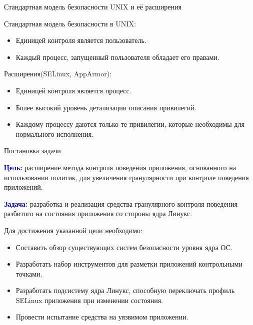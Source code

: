\documentclass{beamer}
\begin{document}
\begin{frame}{Стандартная модель безопасности UNIX и её расширения}

\begin{block}{Стандартная модель безопасности в UNIX:}
\begin{itemize}
\item Единицей контроля является пользователь.
\item Каждый процесс, запущенный пользователя обладает его правами.
\end{itemize}
\end{block}

\begin{block}{Расширения(SELinux, AppArmor):}
\begin{itemize}
\item Единицей контроля является процесс.
\item Более высокий уровень детализации описания привилегий.
\item Каждому процессу даются только те привилегии, которые необходимы для нормального исполнения.
\end{itemize}
\end{block}
\end{frame}

\begin{frame}{Постановка задачи}
  \begin{small}
\textcolor{blue}{\textbf{Цель:}} расширение метода контроля поведения
        приложения, основанного на использовании политик,
        для увеличения гранулярности при контроле поведения приложений.

\textcolor{blue}{\textbf{Задача:}} разработка и реализация средства гранулярного контроля
        поведения разбитого на состояния приложения со стороны
        ядра Линукс.

\end{small}
 \begin{block}{Для достижения указанной цели необходимо:}
  \begin{small}
  \begin{itemize}
   \item {Составить обзор существующих систем безопасности уровня ядра ОС.}
   \item {Разработать набор инструментов для разметки
        приложений контрольными точками.}
   \item {Разработать подсистему ядра Линукс, способную
        переключать профиль SELinux приложения при изменении состояния.}
   \item {Провести испытание средства на уязвимом приложении.}
  \end{itemize}
  \end{small}
 \end{block}
\end{frame}
\end{document}
